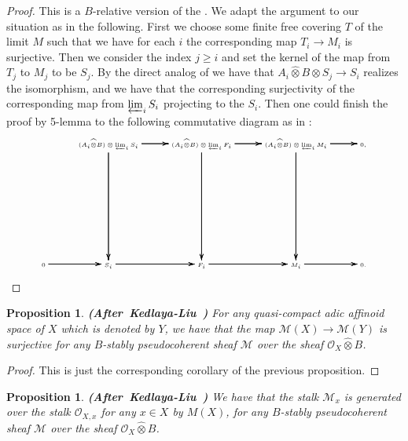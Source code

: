 \documentclass[12pt]{amsart}
\newtheorem{proposition}[theorem]{Proposition}
\theoremstyle{definition}
\numberwithin{equation}{section}
\begin{document}
\begin{proof}
This is a $B$-relative version of the \cite[Lemma 2.6.4]{KL2}. We adapt the argument to our situation as in the following. First we choose some finite free covering $T$ of the limit $M$ such that we have for each $i$ the corresponding map $T_i\rightarrow M_i$ is surjective. Then we consider the index $j\geq i$ and set the kernel of the map from $T_j$ to $M_j$ to be $S_j$. By the direct analog of \cite[Lemma 2.5.6]{KL2} we have that $A_i\widehat{\otimes}B\otimes S_j\overset{}{\rightarrow}S_i$ realizes the isomorphism, and we have that the corresponding surjectivity of the corresponding map from $\varprojlim_i S_i$ projecting to the $S_i$. Then one could finish the proof by 5-lemma to the following commutative diagram as in \cite[Lemma 2.6.4]{KL2}:
\[ \tiny
\xymatrix@C+0pc@R+6pc{
 &(A_i\widehat{\otimes}B)\otimes \varprojlim_i S_i \ar[r]\ar[r]\ar[r] \ar[d]\ar[d]\ar[d] &(A_i\widehat{\otimes}B)\otimes \varprojlim_i F_i \ar[r]\ar[r]\ar[r] \ar[d]\ar[d]\ar[d] &(A_i\widehat{\otimes}B)\otimes \varprojlim_i M_i\ar[r]\ar[r]\ar[r]  \ar[d]\ar[d]\ar[d]&0,\\
0 \ar[r]\ar[r]\ar[r] &S_i   \ar[r]\ar[r]\ar[r] &F_i \ar[r]\ar[r]\ar[r] &M_i \ar[r]\ar[r]\ar[r] &0.\\
}
\]
 
\end{proof}



\begin{proposition}  \mbox{\bf{(After Kedlaya-Liu \cite[Theorem 2.6.5]{KL2})}}
For any quasi-compact adic affinoid space of $X$ which is denoted by $Y$, we have that the map $\mathcal{M}(X)\rightarrow \mathcal{M}(Y)$ is surjective for any $B$-stably pseudocoherent sheaf $\mathcal{M}$ over the sheaf $\mathcal{O}_X\widehat{\otimes}B$.	
\end{proposition}


\begin{proof}
This is just the corresponding corollary of the previous proposition.	
\end{proof}










\begin{proposition}  \mbox{\bf{(After Kedlaya-Liu \cite[Theorem 2.6.5]{KL2})}}
We have that the stalk $\mathcal{M}_x$ is generated over the stalk $\mathcal{O}_{X,x}$ for any $x\in X$ by $M(X)$, for any $B$-stably pseudocoherent sheaf $\mathcal{M}$ over the sheaf $\mathcal{O}_X\widehat{\otimes}B$.	
\end{proposition}
\end{document}
